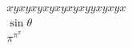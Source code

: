 \documentclass{article}
\begin{document}

    \color{my_colour}

    \begin{gather*}
        xyxyxyxyxyxyxyyxyxyx \\
        \sin \theta \\
        \pi^{\pi^{\pi}} 
    \end{gather*}
\end{document}
